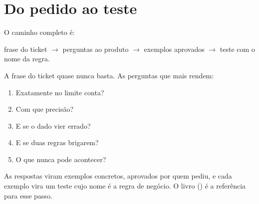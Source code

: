 \section{Do pedido ao teste}

O caminho completo é:

\begin{center}
frase do ticket $\rightarrow$ perguntas ao produto $\rightarrow$
exemplos aprovados $\rightarrow$ teste com o nome da regra.
\end{center}

A frase do ticket quase nunca basta. As perguntas que mais rendem:

\begin{enumerate}
\item Exatamente no limite conta?
\item Com que precisão?
\item E se o dado vier errado?
\item E se duas regras brigarem?
\item O que nunca pode acontecer?
\end{enumerate}

As respostas viram exemplos concretos, aprovados por quem pediu, e cada
exemplo vira um teste cujo nome é a regra de negócio. O livro
 (\citeauthor{livro:adzic2011}) é a referência
para esse passo.
